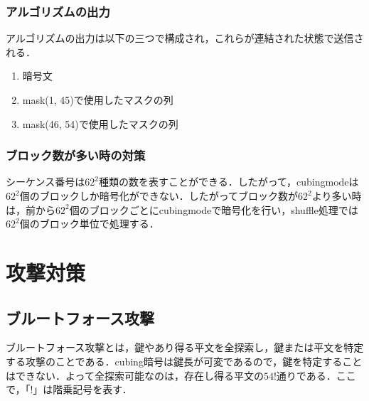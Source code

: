 \documentclass[a4j,titlepage]{jsarticle}
\begin{document}
\subsubsection{アルゴリズムの出力}
アルゴリズムの出力は以下の三つで構成され，これらが連結された状態で送信される．
\begin{screen}
  \begin{enumerate}
    \item 暗号文
    \item mask(\phantom{0}1, 45)で使用したマスクの列
    \item mask(46, 54)で使用したマスクの列
  \end{enumerate}
\end{screen}

\subsubsection{ブロック数が多い時の対策}
シーケンス番号は\(62^2\)種類の数を表すことができる．したがって，cubingmodeは\(62^2\)個のブロックしか暗号化ができない．したがってブロック数が\(62^2\)より多い時は，前から\(62^2\)個のブロックごとにcubingmodeで暗号化を行い，shuffle処理では\(62^2\)個のブロック単位で処理する．

\section{攻撃対策}
\subsection{ブルートフォース攻撃}
ブルートフォース攻撃とは，鍵やあり得る平文を全探索し，鍵または平文を特定する攻撃のことである．cubing暗号は鍵長が可変であるので，鍵を特定することはできない．よって全探索可能なのは，存在し得る平文の\(54!\)通りである．ここで，「\(!\)」は階乗記号を表す．
\end{document}
